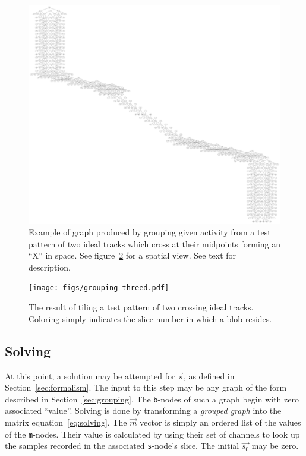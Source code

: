 \documentclass[11pt]{article}
\begin{document}
\begin{figure}[htbp]
\centering
\includegraphics[width=\textwidth]{figs/grouping-example.pdf}
\caption{\label{fig:grouping-graph}
Example of graph produced by grouping given activity from a test pattern of two ideal tracks which cross at their midpoints forming an ``X'' in space.  See figure~\ref{fig:grouping-threed} for a spatial view.  See text for description.}
\end{figure}


\begin{figure}[htbp]
\centering
\texttt{[image: figs/grouping-threed.pdf]}
\caption{\label{fig:grouping-threed}
The result of tiling a test pattern of two crossing ideal tracks.  Coloring simply indicates the slice number in which a blob resides.}
\end{figure}


\subsection{Solving}
\label{sec:Solving}

At this point, a solution may be attempted for $\vec{s}$, as defined in Section~\ref{sec:formalism}. 
The input to this step may be any graph of the form described in Section~\ref{sec:grouping}. 
The \texttt{b}-nodes of such a graph begin with zero associated ``value''. 
Solving is done by transforming a \textit{grouped graph} into the matrix equation~\ref{eq:solving}. 
The $\vec{m}$ vector is simply an ordered list of the values of the \texttt{m}-nodes. 
Their value is calculated by using their set of channels to look up the samples recorded in the associated \texttt{s}-node's slice. 
The initial $\vec{s_0}$ may be zero. 
\end{document}
